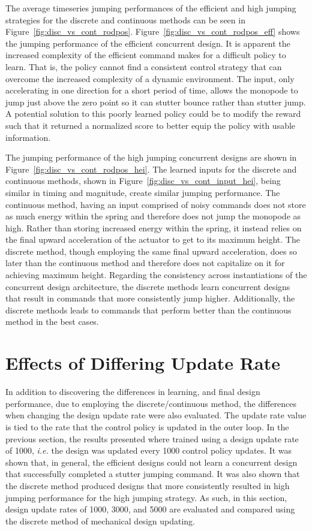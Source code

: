 The average timeseries jumping performances of the efficient and high jumping strategies for the discrete and continuous methods can be seen in Figure~\ref{fig:disc_vs_cont_rodpos}. Figure~\ref{fig:disc_vs_cont_rodpos_eff} shows the jumping performance of the efficient concurrent design. It is apparent the increased complexity of the efficient command makes for a difficult policy to learn. That is, the policy cannot find a consistent control strategy that can overcome the increased complexity of a dynamic environment. The input, only accelerating in one direction for a short period of time, allows the monopode to jump just above the zero point so it can stutter bounce rather than stutter jump. A potential solution to this poorly learned policy could be to modify the reward such that it returned a normalized score to better equip the policy with usable information.

The jumping performance of the high jumping concurrent designs are shown in Figure~\ref{fig:disc_vs_cont_rodpos_hei}. The learned inputs for the discrete and continuous methods, shown in Figure~\ref{fig:disc_vs_cont_input_hei}, being similar in timing and magnitude, create similar jumping performance. The continuous method, having an input comprised of noisy commands does not store as much energy within the spring and therefore does not jump the monopode as high. Rather than storing increased energy within the spring, it instead relies on the final upward acceleration of the actuator to get to its maximum height. The discrete method, though employing the same final upward acceleration, does so later than the continuous method and therefore does not capitalize on it for achieving maximum height. Regarding the consistency across instantiations of the concurrent design architecture, the discrete methods learn concurrent designs that result in commands that more consistently jump higher. Additionally, the discrete methods leads to commands that perform better than the continuous method in the best cases.

\section{Effects of Differing Update Rate}
\label{sec:changing_ur}

In addition to discovering the differences in learning, and final design performance, due to employing the discrete/continuous method, the differences when changing the design update rate were also evaluated. The update rate value is tied to the rate that the control policy is updated in the outer loop. In the previous section, the results presented where trained using a design update rate of 1000, \textit{i.e.} the design was updated every 1000 control policy updates. It was shown that, in general, the efficient designs could not learn a concurrent design that successfully completed a stutter jumping command. It was also shown that the discrete method produced designs that more consistently resulted in high jumping performance for the high jumping strategy. As such, in this section, design update rates of 1000, 3000, and 5000 are evaluated and compared using the discrete method of mechanical design updating.

